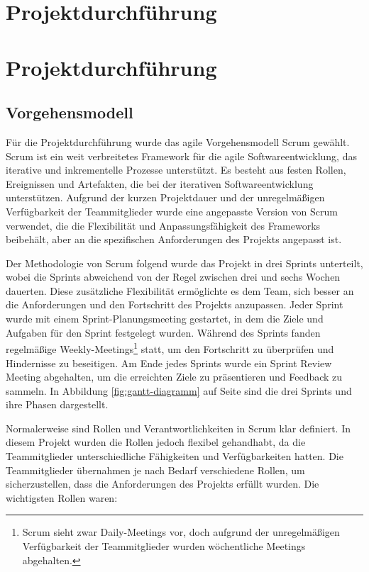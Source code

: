 
\section{Projektdurchführung}\label{projektdurchfuehrung}
\section{Projektdurchführung}\label{projektdurchfuehrung}

\subsection{Vorgehensmodell}\label{vorgehensmodell}

Für die Projektdurchführung wurde das agile Vorgehensmodell \gls{Scrum} gewählt. Scrum ist ein weit verbreitetes Framework für die agile Softwareentwicklung, das iterative und inkrementelle Prozesse unterstützt. Es besteht aus festen Rollen, Ereignissen und Artefakten, die bei der iterativen Softwareentwicklung unterstützen. Aufgrund der kurzen Projektdauer und der unregelmäßigen Verfügbarkeit der Teammitglieder wurde eine angepasste Version von Scrum verwendet, die die Flexibilität und Anpassungsfähigkeit des Frameworks beibehält, aber an die spezifischen Anforderungen des Projekts angepasst ist.

Der Methodologie von Scrum folgend wurde das Projekt in drei Sprints unterteilt, wobei die Sprints abweichend von der Regel zwischen drei und sechs Wochen dauerten. Diese zusätzliche Flexibilität ermöglichte es dem Team, sich besser an die Anforderungen und den Fortschritt des Projekts anzupassen. Jeder Sprint wurde mit einem Sprint-Planungsmeeting gestartet, in dem die Ziele und Aufgaben für den Sprint festgelegt wurden. Während des Sprints fanden regelmäßige Weekly-Meetings\footnote{Scrum sieht zwar Daily-Meetings vor, doch aufgrund der unregelmäßigen Verfügbarkeit der Teammitglieder wurden wöchentliche Meetings abgehalten.} statt, um den Fortschritt zu überprüfen und Hindernisse zu beseitigen. Am Ende jedes Sprints wurde ein Sprint Review Meeting abgehalten, um die erreichten Ziele zu präsentieren und Feedback zu sammeln. In Abbildung \ref{fig:gantt-diagramm} auf Seite \pageref{fig:gantt-diagramm} sind die drei Sprints und ihre Phasen dargestellt.

Normalerweise sind Rollen und Verantwortlichkeiten in Scrum klar definiert. In diesem Projekt wurden die Rollen jedoch flexibel gehandhabt, da die Teammitglieder unterschiedliche Fähigkeiten und Verfügbarkeiten hatten. Die Teammitglieder übernahmen je nach Bedarf verschiedene Rollen, um sicherzustellen, dass die Anforderungen des Projekts erfüllt wurden. Die wichtigsten Rollen waren:

